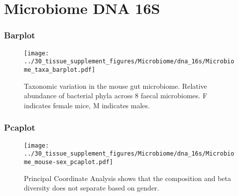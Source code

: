 \clearpage
\section{Microbiome DNA 16S}

\subsubsection{Barplot}
\begin{figure}[h]
\centering
\texttt{[image: ../30\_tissue\_supplement\_figures/Microbiome/dna\_16s/Microbiome\_taxa\_barplot.pdf]}

\caption{Taxonomic variation in the mouse gut microbiome. Relative abundance of bacterial phyla across 8 faecal microbiomes. F indicates female mice, M indicates males.
}
\end{figure}


\clearpage

\subsubsection{Pcaplot}
\begin{figure}[h]
\centering
\texttt{[image: ../30\_tissue\_supplement\_figures/Microbiome/dna\_16s/Microbiome\_mouse-sex\_pcaplot.pdf]}

\caption{Principal Coordinate Analysis shows that the composition and beta diversity does not separate based on gender.}
\end{figure}


